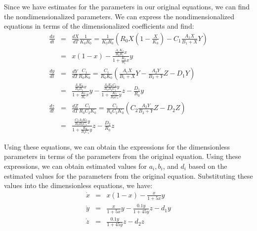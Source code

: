 \documentclass[%
        final,
        notitlepage,
        narroweqnarray,
        inline,
        ]{ieee}
\begin{document}
Since we have estimates for the parameters in our original equations, we can find the nondimensionalized parameters. We can express the nondimensionalized equations in terms of the dimensionalized coefficients and find:
\begin{eqnarray}
\frac{dx}{dt} &=& \frac{dX}{dT} \frac{1}{K_0 R_0} = \frac{1}{K_0 R_0} \left( R_0 X \left(1 - \frac{X}{K_0} \right) - C_1 \frac{A_1 X}{B_1 + X} Y \right) \nonumber \\
&=& x(1-x) - \frac{\frac{A_1 K_0}{R_0 B_1} x}{1 + \frac{K_0}{B_1} x} y \\
\frac{dy}{dt} &=& \frac{dY}{dT} \frac{C_1}{R_0 K_0} = \frac{C_1}{R_0 K_0} \left( \frac{A_1 X}{B_1 + X} Y - \frac{A_2 Y}{B_2 + Y} Z - D_1 Y \right) \nonumber \\
&=& \frac{ \frac{A_1 K_0}{R_0 B_1} x}{1 + \frac{K_0}{B_1} x} y - \frac{\frac{A_2 K_0 C_2}{R_0 B_2 C_1}y}{1 + \frac{K_0}{B_2 C_1} y } z - \frac{D_1}{R_0} y \\
\frac{dz}{dt} &=& \frac{dZ}{dT} \frac{C_1}{R_0 C_2 K_0} = \frac{C_1}{R_0 C_2 K_0} \left( C_2 \frac{A_2 Y}{B_2 + Y} Z - D_2 Z \right) \nonumber \\
&=& \frac{ \frac{C_2 A_2 K_0}{R_0 B_2 C_1} y}{1 + \frac{ K_0}{B_2 C_1} y} z - \frac{D_2}{R_0} z  
\end{eqnarray}

Using these equations, we can obtain the expressions for the dimensionless parameters in terms of the parameters from the original equation. Using these expressions, we can obtain estimated values for $a_i, b_i$, and $d_i$ based on the estimated values for the parameters from the original equation. Substituting these values into the dimensionless equations, we have:
\begin{eqnarray}
\dot{x} &=& x(1-x) - \frac{x }{1 + 5 x}y \\
\dot{y} &=& \frac{x}{1 + 5 x} y - \frac{0.1 y}{1 + 45 y} z - d_1 y \\
\dot{z} &=& \frac{0.1 y}{1 + 45 y} z - d_2 z
\end{eqnarray}
\end{document}
